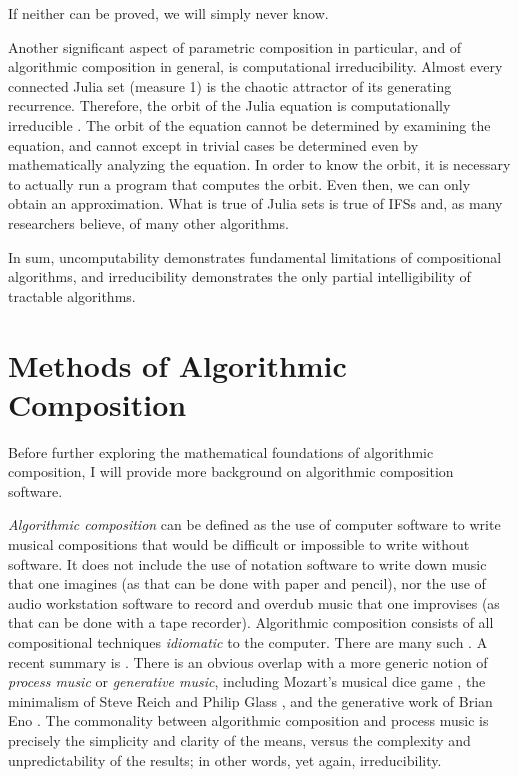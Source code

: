\documentclass[]{interact}
\theoremstyle{plain}%
\theoremstyle{definition}
\theoremstyle{remark}
\begin{document}
If neither can be proved, we will simply never know.

Another significant aspect of parametric composition in particular, and of algorithmic composition in general, is computational irreducibility. Almost every connected Julia set (measure 1) is the chaotic attractor of its generating recurrence. Therefore, the orbit of the Julia equation is computationally irreducible \citep{zwirn2015computational}. The orbit of the equation cannot be determined by examining the equation, and cannot except in trivial cases be determined even by mathematically analyzing the equation. In order to know the orbit, it is necessary to actually run a program that computes the orbit. Even then, we can only obtain an approximation. What is true of Julia sets is true of IFSs and, as many researchers believe, of many other algorithms.

In sum, uncomputability demonstrates fundamental limitations of compositional algorithms, and irreducibility demonstrates the only partial intelligibility of tractable algorithms.

\section{Methods of Algorithmic Composition}

Before further exploring the mathematical foundations of algorithmic composition, I will provide more background on algorithmic composition software.

\emph{Algorithmic composition} can be defined as the use of computer software to write musical compositions that would be difficult or impossible to write without software. It does not include the use of notation software to write down music that one imagines (as that can be done with paper and pencil), nor the use of audio workstation software to record and overdub music that one improvises (as that can be done with a tape recorder). Algorithmic composition consists of all compositional techniques \emph{idiomatic} to the computer. There are many such \citep{fernandez2013ai, arizanet}. A recent summary is \citep{mclean2018oxford}. There is an obvious overlap with a more generic notion of \emph{process music} or \emph{generative music}, including Mozart's musical dice game \citep{humdrumdice}, the minimalism of Steve Reich \citep{reichprocess, 10.2307/832600} and Philip Glass \citep{potter2002four, glass2015words}, and the generative work of Brian Eno \citep{eno1996generative}. The commonality between algorithmic composition and process music is precisely the simplicity and clarity of the means, versus the complexity and unpredictability of the results; in other words, yet again, irreducibility. 
\end{document}
